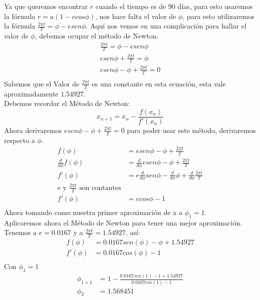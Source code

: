 Ya que queremos encontrar  $r$ cuando el tiempo es de 90 días, para esto usaremos la fórmula $r = a(1-ecos \phi)$, nos hace falta el valor de $\phi$, para esto utilizaremos la fórmula $\frac{2\pi t}{T} = \phi - e sen\phi$. Aquí nos vemos en una complicación para hallar el valor de $\phi$, debemos ocupar el método de Newton.
\begin{align*}
    \frac{2\pi t}{T} = \phi - e sen\phi \\
    e sen \phi + \frac{2\pi t}{T} = \phi \\
     e sen \phi - \phi + \frac{2\pi t}{T} = 0 \\
\end{align*}
Sabemos que el Valor de $\frac{2\pi t}{T}$ es una constante en esta ecuación, esta vale aproximadamente $1.54927$. \\
\newline
Debemos recordar el Método de Newton:
\[
x_{n+1} = x_{n} - \frac{f(x_n)}{f'(x_n)}
\]
Ahora derivaremos $e sen \phi - \phi + \frac{2\pi t}{T} = 0$ para poder usar este método, derivaremos respecto a $\phi$.
\begin{align*}
    f(\phi) &= e sen \phi - \phi + \frac{2\pi t}{T} \\
    \frac{d}{d\phi} f(\phi) &= \frac{d}{d\phi} e sen \phi - \phi + \frac{2\pi t}{T} \\
    f'(\phi) &= e\frac{d}{d\phi} sen \phi - \frac{d}{d\phi} \phi + \frac{d}{d\phi} \frac{2\pi t}{T} \\ 
    \text{e y $\frac{2\pi t}{T}$ son contantes} \\
    f'(\phi) &= e cos \phi - 1 \\ 
\end{align*}
Ahora tomando como nuestra  primer aproximación de x a $\phi_1 = 1$.\\
Aplicaremos ahora el Método de Newton para tener una mejor aproximación.\\
\newline
Tenemos a $e=0.0167$ y a $\frac{2\pi t}{T}=1.54927$, así:\\
\begin{align*}
    f(\phi) &= 0.0167 sen (\phi) - \phi + 1.54927 \\
    f'(\phi) &= 0.0167 cos (\phi) - 1 \\ 
\end{align*}
Con $\phi_1 = 1$
\begin{align*}
    \phi_{1+1} &= 1 - \frac{0.0167 sen (1) - 1 + 1.54927}{0.0167 cos (1) - 1} \\
    \phi_{2} &= 1.568451 \\
\end{align*}
